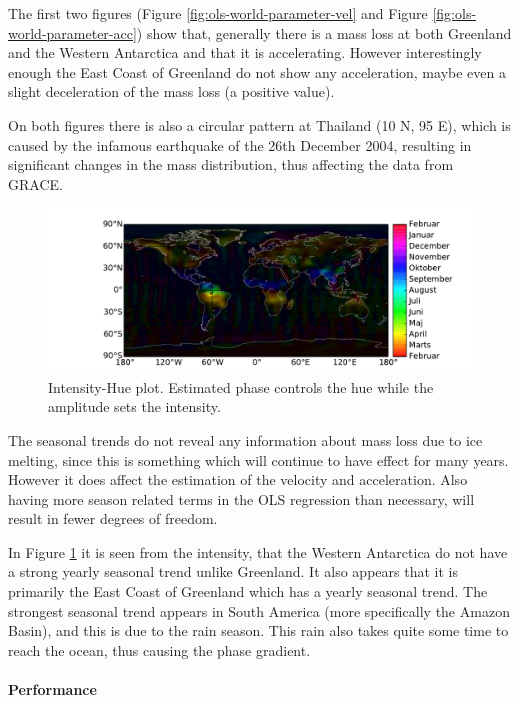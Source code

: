 The first two figures (Figure \ref{fig:ols-world-parameter-vel} and Figure \ref{fig:ols-world-parameter-acc}) show that, generally there is a mass loss at both Greenland and the Western Antarctica and that it is accelerating. However interestingly enough the East Coast of Greenland do not show any acceleration, maybe even a slight deceleration of the mass loss (a positive value).

On both figures there is also a circular pattern at Thailand (10 N, 95 E), which is caused by the infamous earthquake of the 26th December 2004, resulting in significant changes in the mass distribution, thus affecting the data from GRACE.
\begin{figure}[H]
	\centering
	\includegraphics[width=\textwidth]{figures/ols-world-parameter-year}
	\caption{Intensity-Hue plot. Estimated phase controls the hue while the amplitude sets the intensity.}
	\label{fig:ols-world-parameter-year}
\end{figure}

The seasonal trends do not reveal any information about mass loss due to ice melting, since this is something which will continue to have effect for many years. However it does affect the estimation of the velocity and acceleration. Also having more season related terms in the OLS regression than necessary, will result in fewer degrees of freedom.

In Figure \ref{fig:ols-world-parameter-year} it is seen from the intensity, that the Western Antarctica do not have a strong yearly seasonal trend unlike Greenland. It also appears that it is primarily the East Coast of Greenland which has a yearly seasonal trend. The strongest seasonal trend appears in South America (more specifically the Amazon Basin), and this is due to the rain season. This rain also takes quite some time to reach the ocean, thus causing the phase gradient.

\paragraph{Performance} 

